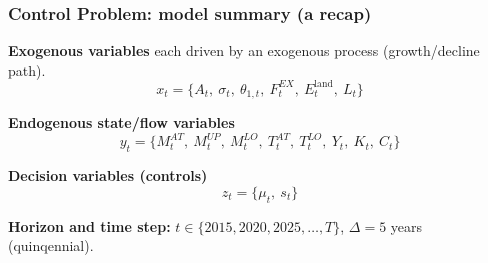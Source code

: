 \documentclass[xcolor=x11names,compress,aspectratio=169]{beamer}%
\makeatletter
\renewenvironment{itemize}{\begin{compactitemize}[<+-| alert@+>]}{\end{compactitemize}}
\makeatother
\begin{document}
\begin{frame}%
%

\frametitle{Control Problem: model summary (a recap)}%


\begin{itemize}
\item \textbf{Exogenous variables} each driven by an exogenous process
(growth/decline path).%
\[
x_{t}=\{A_{t},\ \sigma_{t},\ \theta_{1,t},\ F_{t}^{EX},\ E_{t}^{\text{land}%
},\ L_{t}\}
\]


\item \textbf{Endogenous state/flow variables}%
\[
y_{t}=\{M_{t}^{AT},\ M_{t}^{UP},\ M_{t}^{LO},\ T_{t}^{AT},\ T_{t}^{LO}%
,\ Y_{t},\ K_{t},\ C_{t}\}
\]


\item \textbf{Decision variables (controls)}%
\[
z_{t}=\{\mu_{t},\ s_{t}\}
\]


\item \textbf{Horizon and time step:} $t\in\{2015,2020,2025,\ldots,T\}$,
$\Delta=5$ years (quinqennial).
\end{itemize}

%

\transboxout
\end{frame}%
%
\end{document}
